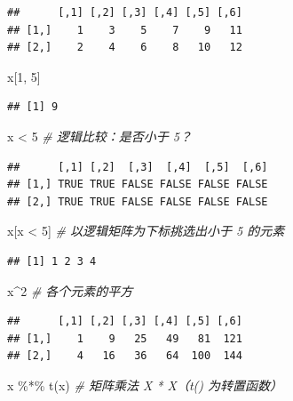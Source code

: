 \documentclass[
  b5paper,
  UTF8,twoside]{book}
\newenvironment{Shaded}{\begin{snugshade}}{\end{snugshade}}
\newcommand{\CommentTok}[1]{\textcolor[rgb]{0.56,0.35,0.01}{\textit{#1}}}
\newcommand{\DecValTok}[1]{\textcolor[rgb]{0.00,0.00,0.81}{#1}}
\newcommand{\FunctionTok}[1]{\textcolor[rgb]{0.00,0.00,0.00}{#1}}
\newcommand{\NormalTok}[1]{#1}
\newcommand{\SpecialCharTok}[1]{\textcolor[rgb]{0.00,0.00,0.00}{#1}}
\begin{document}
\begin{verbatim}
##      [,1] [,2] [,3] [,4] [,5] [,6]
## [1,]    1    3    5    7    9   11
## [2,]    2    4    6    8   10   12
\end{verbatim}

\begin{Shaded}
\begin{Highlighting}[]
\NormalTok{x[}\DecValTok{1}\NormalTok{, }\DecValTok{5}\NormalTok{]}
\end{Highlighting}
\end{Shaded}

\begin{verbatim}
## [1] 9
\end{verbatim}

\begin{Shaded}
\begin{Highlighting}[]
\NormalTok{x }\SpecialCharTok{\textless{}} \DecValTok{5} \CommentTok{\# 逻辑比较：是否小于 5？}
\end{Highlighting}
\end{Shaded}

\begin{verbatim}
##      [,1] [,2]  [,3]  [,4]  [,5]  [,6]
## [1,] TRUE TRUE FALSE FALSE FALSE FALSE
## [2,] TRUE TRUE FALSE FALSE FALSE FALSE
\end{verbatim}

\begin{Shaded}
\begin{Highlighting}[]
\NormalTok{x[x }\SpecialCharTok{\textless{}} \DecValTok{5}\NormalTok{] }\CommentTok{\# 以逻辑矩阵为下标挑选出小于 5 的元素}
\end{Highlighting}
\end{Shaded}

\begin{verbatim}
## [1] 1 2 3 4
\end{verbatim}

\begin{Shaded}
\begin{Highlighting}[]
\NormalTok{x}\SpecialCharTok{\^{}}\DecValTok{2} \CommentTok{\# 各个元素的平方}
\end{Highlighting}
\end{Shaded}

\begin{verbatim}
##      [,1] [,2] [,3] [,4] [,5] [,6]
## [1,]    1    9   25   49   81  121
## [2,]    4   16   36   64  100  144
\end{verbatim}

\begin{Shaded}
\begin{Highlighting}[]
\NormalTok{x }\SpecialCharTok{\%*\%} \FunctionTok{t}\NormalTok{(x) }\CommentTok{\# 矩阵乘法 X * X\textquotesingle{}（t() 为转置函数）}
\end{Highlighting}
\end{Shaded}
\end{document}
